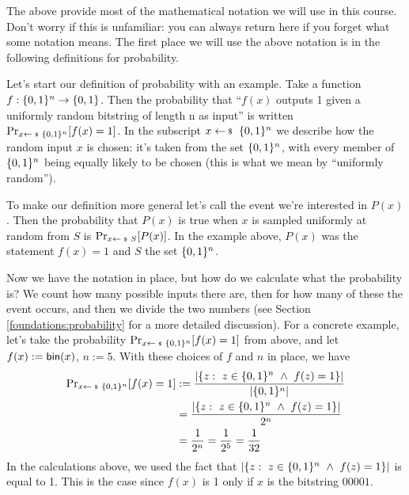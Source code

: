 The above provide most of the mathematical notation we will use in this course. Don't worry if this is unfamiliar: you can always return here if you forget what some notation means. The first place we will use the above notation is in the following definitions for probability.

Let's start our definition of probability with an example. Take a function $f: \{0,1\}^n \rightarrow \{0,1\}$. Then the probability that ``$f(x)$ outputs 1 given a uniformly random bitstring of length n as input'' is written \(\probsub{x \sample \bin^n}{f(x) = 1}\). In the subscript $x \sample \bin^n$ we describe how the random input $x$ is chosen: it's taken from the set $\{0,1\}^n$, with every member of $\{0,1\}^n$ being equally likely to be chosen (this is what we mean by ``uniformly random''). 

To make our definition more general let's call the event we're interested in $P(x)$. Then the probability that $P(x)$ is true when $x$ is sampled uniformly at random from $S$ is \(\probsub{x \sample S}{P(x)}\). In the example above, $P(x)$ was the statement $f(x) = 1$ and $S$ the set $\{0,1\}^n$.

Now we have the notation in place, but how do we calculate what the probability is? We count how many possible inputs there are, then for how many of these the event occurs, and then we divide the two numbers (see Section \ref{foundations:probability} for a more detailed discussion). For a concrete example, let's take the probability \(\probsub{x \sample \bin^n}{f(x) = 1}\) from above, and let $f(x) := \textsf{bin}(x)$, $n := 5$. With these choices of $f$ and $n$ in place, we have
\begin{align*}
  \probsub{x\sample \bin^n}{f(x)=1} & :=\frac{\abs{\{z:\  z\in\bin^n\ \wedge \ f(z)=1\}}}{\abs{\bin^n}} \\
                                    & =\frac{\abs{\{z:\  z\in\bin^n\ \wedge \ f(z)=1\}}}{2^n} \\
                                    & =\frac{1}{2^n} = \frac{1}{2^5} = \frac{1}{32} 
\end{align*}
In the calculations above, we used the fact that $\abs{\{z:\  z\in\bin^n\ \wedge \ f(z)=1\}}$ is equal to 1. This is the case since $f(x)$ is 1 only if $x$ is the bitstring $00001$.